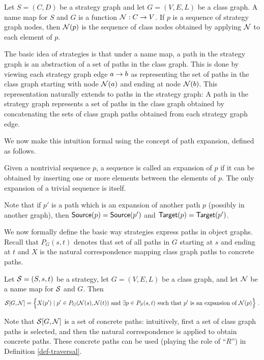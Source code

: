 \begin{definition}
Let $S=(C,D)$  be a  strategy graph and let $G=(V,E,L)$ be a class
graph. A {\sf name map} for $S$ and $G$ is a function
${\cal N}:C\rightarrow V$. If $p$ is a sequence of strategy graph nodes,
then ${\cal N}(p)$ is the sequence of class nodes obtained by applying ${\cal N}$
to each element of $p$.
\end{definition}

The basic idea of strategies is that under a name map, a path in the
strategy graph is an abstraction of a set of paths in the class
graph. This is done by viewing each strategy graph edge $a\stackrel{}{\rightarrow}b$
as representing the set of paths in the class graph starting with node
${\cal N}(a)$ and ending at node ${\cal N}(b)$.  This representation naturally
extends to paths in the strategy graph: A path in the strategy graph
represents a set of paths in the class graph obtained by concatenating
the sets of class graph paths obtained from each strategy graph edge.

We now make this intuition formal using the concept of path expansion,
defined as follows.

\begin{definition}
Given a nontrivial sequence $p$, a sequence is called an {\sf expansion} of $p$
if it can be obtained by inserting one or more elements between the elements of
$p$.  The only expansion of a trivial sequence is itself.
\end{definition}
%
Note that if $p'$ is a path which is an expansion of another path $p$
(possibly in another graph), then
$\mbox{\sf Source}(p)=\mbox{\sf Source}(p')$ and $\mbox{\sf Target}(p)=\mbox{\sf Target}(p')$.

We now formally define the basic way strategies express paths in
object graphs.  Recall that $P_G(s,t)$ denotes that set of all paths
in $G$ starting at $s$ and ending at $t$ and $X$ is the natural
correspondence mapping class graph paths to concrete paths.

\begin{definition}
Let ${\cal S}=(S,s,t)$ be a strategy, let $G=(V,E,L)$ be a class graph, and
let ${\cal N}$ be a name map for ${\cal S}$ and $G$. Then
$$
{\cal S}[G,{\cal N}]=\Bigl\{
X(p')\mid p'\in P_G({\cal N}(s),{\cal N}(t))\mbox{ and }
 \exists p\in P_S(s,t)\mbox{ such that }p'\mbox{ is an expansion of }{\cal N}(p)
\Bigr\}~.
$$
\end{definition}
%
Note that ${\cal S}[G,{\cal N}]$ is a set of concrete paths: intuitively, first
a set of class graph paths is selected, and then the natural
correspondence is applied to obtain concrete paths.  These concrete
paths can be used (playing the role of ``$R$'') in Definition
\ref{def-traversal}.

